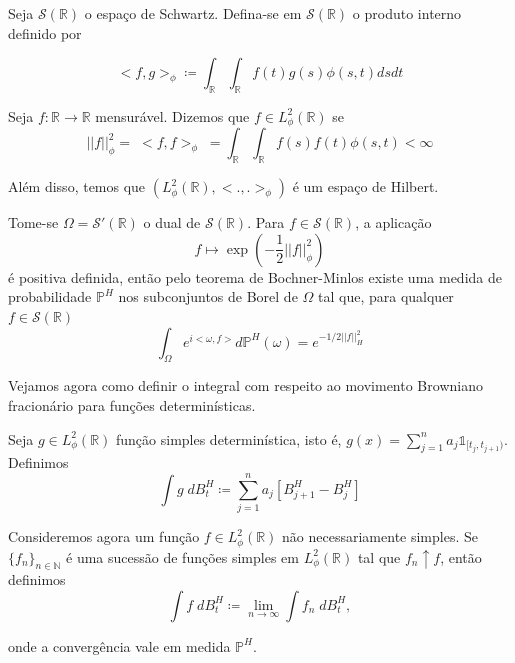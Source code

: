 \documentclass{article}
\begin{document}
Seja $\mathcal{S}(\mathbb{R})$ o espaço de Schwartz. Defina-se em $\mathcal{S}(\mathbb{R})$ o produto interno definido por

$$<f,g>_{\phi} \coloneq \int_\mathbb{R}\int_\mathbb{R} f(t)g(s)\phi(s,t)dsdt$$

Seja $f: \mathbb{R} \rightarrow \mathbb{R}$ mensurável. Dizemos que $f \in L_\phi^2(\mathbb{R})$ se
$$||f||_\phi^2 =\; <f,f>_\phi\;=\int_\mathbb{R}\int_\mathbb{R} f(s)f(t)\phi(s,t)<\infty$$

Além disso, temos que $(L^2_\phi(\mathbb{R}),<.,.>_\phi)$ é um espaço de Hilbert.

\vspace{0.5cm}


Tome-se $\Omega = \mathcal{S}'(\mathbb{R})$ o dual de $\mathcal{S}(\mathbb{R})$. Para $f \in \mathcal{S}(\mathbb{R})$, a aplicação 
$$f \mapsto \exp \left(-\frac{1}{2}||f||_\phi^2 \right)$$ é positiva definida, então pelo teorema de Bochner-Minlos existe uma medida de probabilidade $\mathbb{P}^H$ nos subconjuntos de Borel de $\Omega$ tal que, para qualquer $f \in \mathcal{S}(\mathbb{R})$ $$\int_\Omega e^{i<\omega,f>} d \mathbb{P}^H(\omega)=e^{-1/2 ||f||_H^2}$$

\vspace{0.5cm}
Vejamos agora como definir o integral com respeito ao movimento Browniano fracionário para funções determinísticas.

Seja $g \in L^2_\phi(\mathbb{R})$ função simples determinística, isto é, $g(x)=\sum_{j=1}^n a_j \mathds{1}_{[t_j,t_{j+1})}$. 
Definimos 
$$\int g\;dB^H_t \coloneq \sum_{j=1}^na_j[B^H_{j+1}-B^H_{j}]$$

Consideremos agora um função $f \in L^2_\phi(\mathbb{R})$ não necessariamente simples. Se $\{f_n\}_{n \in \mathbb{N}}$ é uma sucessão de funções simples em $L^2_\phi(\mathbb{R})$ tal que $f_n \uparrow f$, então definimos 
$$\int f\;dB_t^H \coloneq \lim_{n \rightarrow \infty} \int f_n \; dB^H_t,$$

onde a convergência vale em medida $\mathbb{P}^H$.


\vspace{1cm}
\end{document}
